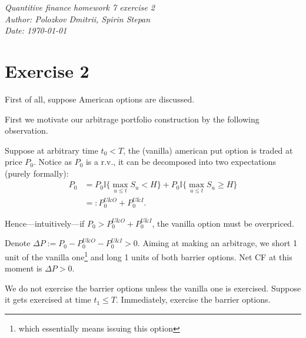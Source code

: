 \documentclass[12pt]{article}
\theoremstyle{remark}
\newcommand{\todayYYMMDD}{\the\year-\the\month-\the\day}
\begin{document}
\hfill
\begin{center}
\textit{Quantitive finance homework 7 exercise 2}\\
\textit{Author: Polozkov Dmitrii, Spirin Stepan}\\
\textit{Date: \today}
\end{center}


\section*{Exercise 2}
First of all, suppose American options are discussed. 


First we motivate our arbitrage portfolio construction by the following observation.

Suppose at arbitrary time $t_0<T$, the (vanilla) american put option is traded at price $P_0$.
Notice as $P_0$ is a r.v., it can be decomposed into two expectations (purely formally):
\begin{align*}
    P_0 &= P_0\mathbb{I}\{\max_{u\le t} S_u < H\} + P_0\mathbb{I}\{\max_{u\le t} S_u \ge H\}\\
    &=:P_0^{U\&O}+P_0^{U\&I}.
\end{align*}

Hence---intuitively---if $P_0>P_0^{U\&O}+P_0^{U\&I}$, the vanilla option must be overpriced. 

Denote $\Delta P := P_0-P_0^{U\&O}-P_0^{U\&I}>0$.
Aiming at making an arbitrage, we short 1 unit of the vanilla one\footnote{which essentially means issuing this option} and long 1 units of both barrier options. 
Net CF at this moment is $\Delta P>0$.

We do not exercise the barrier options unless the vanilla one is exercised. 
Suppose it gets exercised at time $t_1\le T$. 
Immediately, exercise the barrier options.
\end{document}
